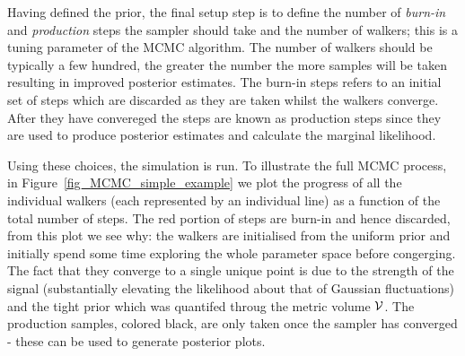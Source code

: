 \documentclass[aps, prd, twocolumn, superscriptaddress, floatfix, showpacs, nofootinbib, longbibliography]{revtex4-1}
\begin{document}
Having defined the prior, the final setup step is to define the number of
\emph{burn-in} and \emph{production} steps the sampler should take and the
number of walkers; this is a tuning parameter of the MCMC algorithm. The number
of walkers should be typically a few hundred, the greater the number the more
samples will be taken resulting in improved posterior estimates. The burn-in
steps refers to an initial set of steps which are discarded as they are taken
whilst the walkers converge. After they have convereged the steps are known as
production steps since they are used to produce posterior estimates and
calculate the marginal likelihood.

Using these choices, the simulation is run. To illustrate the full MCMC
process, in Figure~\ref{fig_MCMC_simple_example} we plot the progress of all
the individual walkers (each represented by an individual line) as a function
of the total number of steps. The red portion of steps are burn-in and hence
discarded, from this plot we see why: the walkers are initialised from the
uniform prior and initially spend some time exploring the whole parameter space
before congerging. The fact that they converge to a single unique point is due
to the strength of the signal (substantially elevating the likelihood about
that of Gaussian fluctuations) and the tight prior which was quantifed throug the
metric volume $\mathcal{V}$. The production samples, colored black, are only taken once
the sampler has converged - these can be used to generate posterior plots.
\end{document}
